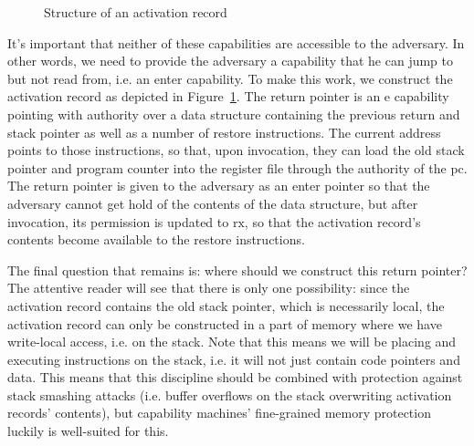 \documentclass[compsoc,conference,letterpaper,fleqn]{IEEEtran}
\newcommand{\plainperm}[1]{\mathrm{#1}}
\newcommand{\exec}{\plainperm{rx}}
\newcommand{\entry}{\plainperm{e}}
\begin{document}
\begin{figure}
  
  \caption{Structure of an activation record}
  \label{fig:activ-rec-struct}
\end{figure}

It's important that neither of these capabilities are accessible to the
adversary. In other words, we need to provide the adversary a capability that he
can jump to but not read from, i.e. an enter capability. To make this work, we
construct the activation record as depicted in
Figure~\ref{fig:activ-rec-struct}. The return pointer is an $\entry$ capability
pointing with authority over a data structure containing the previous return and
stack pointer as well as a number of restore instructions. The current address
points to those instructions, so that, upon invocation, they can load the old
stack pointer and program counter into the register file through the authority
of the pc. The return pointer is given to the adversary as an enter pointer so
that the adversary cannot get hold of the contents of the data structure, but
after invocation, its permission is updated to $\exec$, so that the activation
record's contents become available to the restore instructions.

The final question that remains is: where should we construct this return
pointer? The attentive reader will see that there is only one possibility: since
the activation record contains the old stack pointer, which is necessarily
local, the activation record can only be constructed in a part of memory where
we have write-local access, i.e. on the stack. Note that this means we will be
placing and executing instructions on the stack, i.e. it will not just contain
code pointers and data.  This means that this discipline should be combined with
protection against stack smashing attacks (i.e. buffer overflows on the stack overwriting activation
records' contents), but capability machines' fine-grained memory protection
luckily is well-suited for this.
\end{document}
